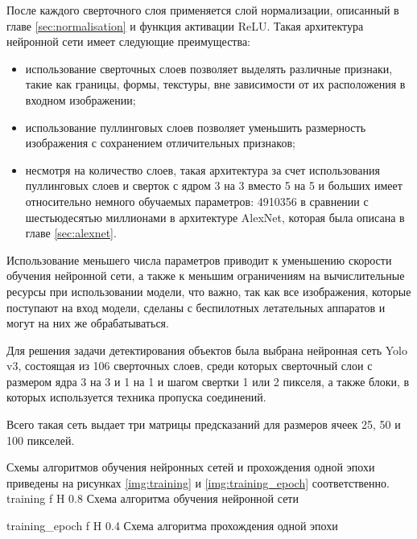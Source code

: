 После каждого сверточного слоя применяется слой нормализации, описанный в главе \ref{sec:normalisation} и функция активации ReLU. Такая архитектура нейронной сети имеет следующие преимущества:
\begin{itemize}
	\item использование сверточных слоев позволяет выделять различные признаки, такие как границы, формы, текстуры, вне зависимости от их расположения в входном изображении;
	\item использование пуллинговых слоев позволяет уменьшить размерность изображения с сохранением отличительных признаков;
	\item несмотря на количество слоев, такая архитектура за счет использования пуллинговых слоев и сверток с ядром 3 на 3 вместо 5 на 5 и больших имеет относительно немного обучаемых параметров: 4910356 в сравнении с шестьюдесятью миллионами в архитектуре AlexNet, которая была описана в главе \ref{sec:alexnet}.
\end{itemize}

Использование меньшего числа параметров приводит к уменьшению скорости обучения нейронной сети, а также к меньшим ограничениям на вычислительные ресурсы при использовании модели, что важно, так как все изображения, которые поступают на вход модели, сделаны с беспилотных летательных аппаратов и могут на них же обрабатываться.

Для решения задачи детектирования объектов была выбрана нейронная сеть Yolo v3, состоящая из 106 сверточных слоев, среди которых сверточный слои с размером ядра 3 на 3 и 1 на 1 и шагом свертки 1 или 2 пикселя, а также блоки, в которых используется техника пропуска соединений.

Всего такая сеть выдает три матрицы предсказаний для размеров ячеек 25, 50 и 100 пикселей.

Схемы алгоритмов обучения нейронных сетей и прохождения одной эпохи приведены на рисунках \ref{img:training} и \ref{img:training_epoch} соответственно.
{training} %
{f} %
{H} %
{0.8\textwidth} %
{Схема алгоритма обучения нейронной сети} %

{training_epoch} %
{f} %
{H} %
{0.4\textwidth} %
{Схема алгоритма прохождения одной эпохи} %

